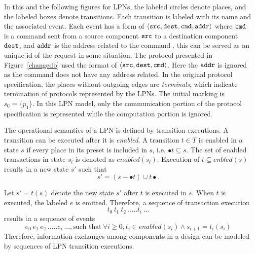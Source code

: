 \documentclass[12pt,frontmatter,copyright,thesis]{usfmanus}
\begin{document}
  In this and the
 following figures for LPNs, the labeled circles denote
 places, and the labeled boxes denote transitions.  Each
 transition is labeled with its name and the associated
 event.  Each event has a form of $\langle {\tt src, dest,
   cmd,addr} \rangle$ where ${\tt cmd}$ is a command sent from a
 source component ${\tt src}$ to a destination component
 ${\tt dest}$, and ${\tt addr}$ is the address related to the command
, this can be served as an unique id of the request in some situation.
 The protocol presented in Figure~\ref{changedb} used the
 format of  $\langle {\tt src, dest,
   cmd} \rangle$. Here the ${\tt addr}$ is ignored
   as the command does not have
   any address related.
  In the original protocol specification, the places without outgoing edges
 are {\em terminals}, which indicate termination of protocols
 represented by the LPNs.  The initial marking is
 $\mathit{s_0} = \{p_1\}$.  In this LPN model, only the
 communication portion of the protocol specification is
 represented while the computation portion is ignored.


 The operational semantics of a LPN is defined by transition executions.  
 A transition can be executed after it is {\em enabled}.  
 A transition $t \in T$ is enabled in a state $s$ if every place in its preset is included in $s$, i.e. $\bullet{t} \subseteq s$. 
  The set of enabled transactions in state $s_i$ is denoted as $enabled(s_i)$.
 Execution of $t \subseteq enbled(s)$ results in a new state $s'$ such that 
 \[
 s' = (s - \bullet{t}) \cup t\bullet.
 \]
 
 Let $s'=t(s)$ denote the new state $s'$ after $t$ is executed in $s$.
 When $t$ is executed, the labeled $e$ is emitted.
 Therefore, a sequence of transaction execution
 \[ 
 t_0\ t_1\ t_2\ .....t_i\ ...
 \]
 results in a sequence of events
 \[
e_0\ e_1\ e_2\ .....e_i\ ..., \mbox{such that}\ \forall i \ge 0, t_i \in enabled(s_i) \wedge s_{i+1}=t_i(s_i)
 \]
 Therefore, information exchanges among components in a design can be modeled by
 sequences of LPN transition executions.

\end{document}

